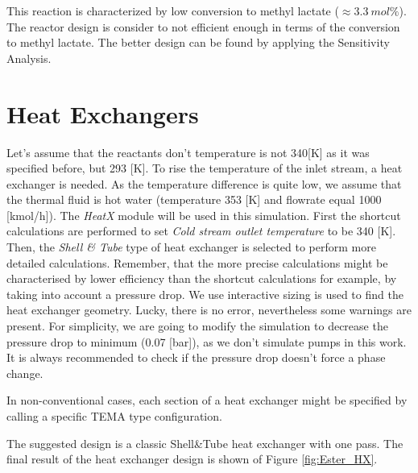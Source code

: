 This reaction is characterized by low conversion to methyl lactate ($\approx 3.3~mol\%$). The reactor design is consider to not efficient enough in terms of the conversion to methyl lactate. The better design can be found by applying the Sensitivity Analysis.

\section{Heat Exchangers}

Let's assume that the reactants don't temperature is not 340[K] as it was specified before, but 293 [K]. To rise the temperature of the inlet stream, a heat exchanger is needed. As the temperature difference is quite low, we assume that the thermal fluid is hot water (temperature 353 [K] and flowrate equal 1000 [kmol/h]). The \textit{HeatX} module will be used in this simulation. First the shortcut calculations are performed to set \textit{Cold stream outlet temperature} to be 340 [K]. Then, the \textit{Shell \& Tube} type of heat exchanger is selected to perform more detailed calculations. Remember, that the more precise calculations might be characterised by lower efficiency than the shortcut calculations for example, by taking into account a pressure drop.
We use interactive sizing is used to find the heat exchanger geometry. Lucky, there is no error, nevertheless some warnings are present. For simplicity, we are going to modify the simulation to decrease the pressure drop to minimum (0.07 [bar]), as we don't simulate pumps in this work. It is always recommended to check if the pressure drop doesn't force a phase change.

In non-conventional cases, each section of a heat exchanger might be specified by calling a specific TEMA type configuration.

The suggested design is a classic Shell\&Tube heat exchanger with one pass. The final result of the heat exchanger design is shown of Figure \ref{fig:Ester_HX}.

